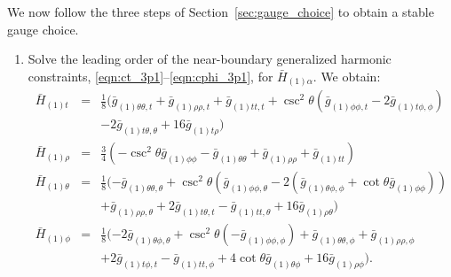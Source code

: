 \documentclass[a4paper,11pt]{article}
\numberwithin{equation}{section}
\begin{document}
We now follow the three steps of Section~\ref{sec:gauge_choice} to obtain a stable gauge choice.
\begin{enumerate}
\item Solve the leading order of the near-boundary generalized harmonic constraints, \eqref{eqn:ct_3p1}--\eqref{eqn:cphi_3p1}, for $\bar{H}_{(1)\alpha}$. We obtain:
\begin{eqnarray}\label{eqn:target_gauge_trhothetaphi_step1}
\bar{H}_{(1)t}&=&\frac{1}{8} (\bar{g}_{(1)\theta \theta,t}+\bar{g}_{(1) \rho \rho ,t}+\bar{g}_{(1)
   \text{$tt$},t}+\csc ^2\theta \left(\bar{g}_{(1) \phi \phi ,t}-2 \bar{g}_{(1) \text{$t$$\phi
   $},\phi }\right)\nonumber\\
   &&-2 \bar{g}_{(1) \text{$t$$\theta $},\theta }+16 \bar{g}_{(1) \text{$t$$\rho
   $}})\nonumber \\
\bar{H}_{(1)\rho}&=&\frac{3}{4} \left(-\csc ^2\theta \bar{g}_{(1) \phi \phi }-\bar{g}_{(1)\theta \theta}+\bar{g}_{(1) \rho \rho }+\bar{g}_{(1) \text{$tt$}}\right)\nonumber\\
\bar{H}_{(1)\theta}&=&\frac{1}{8} (-\bar{g}_{(1)\theta \theta,\theta }+\csc ^2\theta \left(\bar{g}_{(1)
   \phi \phi ,\theta }-2 \left(\bar{g}_{(1)\theta \phi,\phi }+\cot \theta  \bar{g}_{(1)
   \phi \phi }\right)\right)\nonumber\\
   &&+\bar{g}_{(1) \rho \rho ,\theta }+2 \bar{g}_{(1) \text{$t$$\theta
   $},t}-\bar{g}_{(1) \text{$tt$},\theta }+16 \bar{g}_{(1) \rho \theta })\nonumber\\
\bar{H}_{(1)\phi}&=&\frac{1}{8} (-2 \bar{g}_{(1)\theta \phi,\theta }+\csc ^2\theta \left(-\bar{g}_{(1)
   \phi \phi ,\phi }\right)+\bar{g}_{(1)\theta \theta,\phi }+\bar{g}_{(1) \rho \rho ,\phi
   }\nonumber\\
   &&+2 \bar{g}_{(1) \text{$t$$\phi $},t}-\bar{g}_{(1) \text{$tt$},\phi }+4 \cot \theta 
   \bar{g}_{(1)\theta \phi}+16 \bar{g}_{(1) \rho \phi }).
\end{eqnarray}


\end{enumerate}
\end{document}
